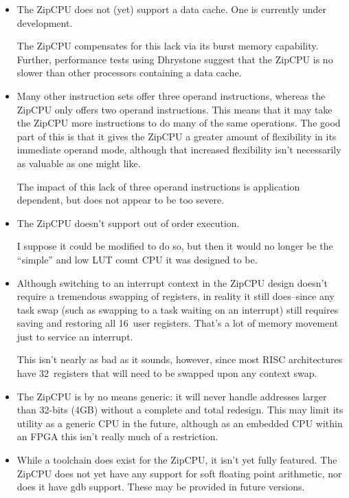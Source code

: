 \documentclass{gqtekspec}
\begin{document}
\begin{itemize}
\item The ZipCPU does not (yet) support a data cache.  One is currently under
	development.

	The ZipCPU compensates for this lack via its burst memory capability.
	Further, performance tests using Dhrystone suggest that the ZipCPU is
	no slower than other processors containing a data cache.

\item Many other instruction sets offer three operand instructions, whereas
	the ZipCPU only offers two operand instructions. This means that it
	may take the ZipCPU more instructions to do many of the same operations.
	The good part of this is that it gives the ZipCPU a greater amount of
	flexibility in its immediate operand mode, although that increased
	flexibility isn't necessarily as valuable as one might like.

	The impact of this lack of three operand instructions is application
	dependent, but does not appear to be too severe.

\item The ZipCPU doesn't support out of order execution.

	I suppose it could be modified to do so, but then it would no longer
	be the ``simple'' and low LUT count CPU it was designed to be.

\item Although switching to an interrupt context in the ZipCPU design doesn't
	require a tremendous swapping of registers, in reality it still
	does--since any task swap (such as swapping to a task waiting on an
	interrupt) still requires saving and restoring all 16~user registers.
	That's a lot of memory movement just to service an interrupt.

	This isn't nearly as bad as it sounds, however, since most RISC
	architectures have 32~registers that will need to be swapped upon any
	context swap.

\item The ZipCPU is by no means generic: it will never handle addresses
	larger than 32-bits (4GB) without a complete and total redesign.
	This may limit its utility as a generic CPU in the future, although
	as an embedded CPU within an FPGA this isn't really much of a
	restriction.

\item While a toolchain does exist for the ZipCPU, it isn't yet fully featured.
	The ZipCPU does not yet have any support for soft floating point
	arithmetic, nor does it have gdb support.  These may be provided
	in future versions.
\end{itemize}
\end{document}

